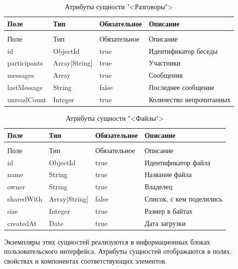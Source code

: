 \begin{xltabular}{\textwidth}{|l|l|p{3.2cm}|X|}
  \caption{Атрибуты сущности "<Разговоры">\label{talks:table}}\\ \hline
  Поле & Тип & Обязательное & Описание \\ \hline
  \endfirsthead
  \\ \hline
  Поле & Тип & Обязательное & Описание \\ \hline
  \endhead
  id & ObjectId & true & Идентификатор беседы \\ \hline
  participants & Array[String] & true & Участники \\ \hline
  messages & Array & true & Сообщения \\ \hline
  lastMessage & String & false & Последнее сообщение \\ \hline
  unreadCount & Integer & true & Количество непрочитанных \\ \hline
\end{xltabular}

\begin{xltabular}{\textwidth}{|l|l|p{3.2cm}|X|}
  \caption{Атрибуты сущности "<Файлы">\label{files:table}}\\ \hline
  Поле & Тип & Обязательное & Описание \\ \hline
  \endfirsthead
  \\ \hline
  Поле & Тип & Обязательное & Описание \\ \hline
  \endhead
  id & ObjectId & true & Идентификатор файла \\ \hline
  name & String & true & Название файла \\ \hline
  owner & String & true & Владелец \\ \hline
  sharedWith & Array[String] & false & Список, с кем поделились \\ \hline
  size & Integer & true & Размер в байтах \\ \hline
  createdAt & Date & true & Дата загрузки \\ \hline
\end{xltabular}

Экземпляры этих сущностей реализуются в информационных блоках пользовательского интерфейса. Атрибуты сущностей отображаются в полях, свойствах и компонентах соответствующих элементов.
